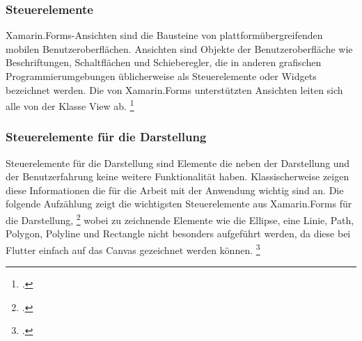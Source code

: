 \subsubsection{Steuerelemente}

Xamarin.Forms-Ansichten sind die Bausteine von plattformübergreifenden mobilen Benutzeroberflächen. Ansichten sind Objekte der Benutzeroberfläche wie Beschriftungen, Schaltflächen und Schieberegler, die in anderen grafischen Programmierumgebungen üblicherweise als Steuerelemente oder Widgets bezeichnet werden. Die von Xamarin.Forms unterstützten Ansichten leiten sich alle von der Klasse View ab. \footcite[Vgl.][Abgerufen am \today]{MicrosoftXamViews2020}

\subsubsection{Steuerelemente für die Darstellung}
Steuerelemente für die Darstellung sind Elemente die neben der Darstellung und der Benutzerfahrung keine weitere Funktionalität haben. Klassischerweise zeigen diese Informationen die für die Arbeit mit der Anwendung wichtig sind an.  Die folgende Aufzählung zeigt die wichtigsten Steuerelemente aus Xamarin.Forms für die Darstellung, \footcite[Vgl.][Abgerufen am \today]{MicrosoftXamLayouts2018} wobei zu zeichnende Elemente wie die Ellipse,  eine Linie,  Path,  Polygon, Polyline und Rectangle nicht besonders aufgeführt werden, da diese bei Flutter einfach auf das Canvas gezeichnet werden können.  \footcite[Vgl.][Abgerufen am \today]{GoogleFlutterCanvas2020}

